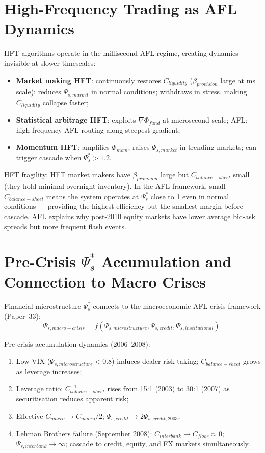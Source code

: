 \documentclass[11pt]{article}
\begin{document}
\section{High-Frequency Trading as AFL Dynamics}

HFT algorithms operate in the millisecond AFL regime, creating dynamics invisible at slower
timescales:
\begin{itemize}
    \item \textbf{Market making HFT}: continuously restores $C_{liquidity}$ ($\beta_{provision}$
          large at ms scale); reduces $\Psi_{s,market}$ in normal conditions; withdraws in stress,
          making $C_{liquidity}$ collapse faster;
    \item \textbf{Statistical arbitrage HFT}: exploits $\nabla\Phi_{fund}$ at microsecond scale;
          AFL: high-frequency AFL routing along steepest gradient;
    \item \textbf{Momentum HFT}: amplifies $\Phi_{mom}$; raises $\Psi_{s,market}$ in trending
          markets; can trigger cascade when $\Psi_s^* > 1.2$.
\end{itemize}

HFT fragility: HFT market makers have $\beta_{provision}$ large but $C_{balance-sheet}$ small
(they hold minimal overnight inventory). In the AFL framework, small $C_{balance-sheet}$ means
the system operates at $\Psi_s^*$ close to 1 even in normal conditions --- providing the highest
efficiency but the smallest margin before cascade. AFL explains why post-2010 equity markets
have lower average bid-ask spreads but more frequent flash events.

\section{Pre-Crisis $\Psi_s^*$ Accumulation and Connection to Macro Crises}

Financial microstructure $\Psi_s^*$ connects to the macroeconomic AFL crisis framework (Paper~33):
\begin{equation}
\Psi_{s,macro-crisis} = f\left(\Psi_{s,microstructure}, \Psi_{s,credit}, \Psi_{s,institutional}\right).
\end{equation}

Pre-crisis accumulation dynamics (2006--2008):
\begin{enumerate}
    \item Low VIX ($\Psi_{s,microstructure} < 0.8$) induces dealer risk-taking; $C_{balance-sheet}$
          grows as leverage increases;
    \item Leverage ratio: $C_{balance-sheet}^{-1}$ rises from 15:1 (2003) to 30:1 (2007) as
          securitisation reduces apparent risk;
    \item Effective $C_{macro} \to C_{macro}/2$; $\Psi_{s,credit} \to 2\Psi_{s,credit,2003}$;
    \item Lehman Brothers failure (September 2008): $C_{interbank} \to C_{floor} \approx 0$;
          $\Psi_{s,interbank} \to \infty$; cascade to credit, equity, and FX markets simultaneously.
\end{enumerate}
\end{document}
